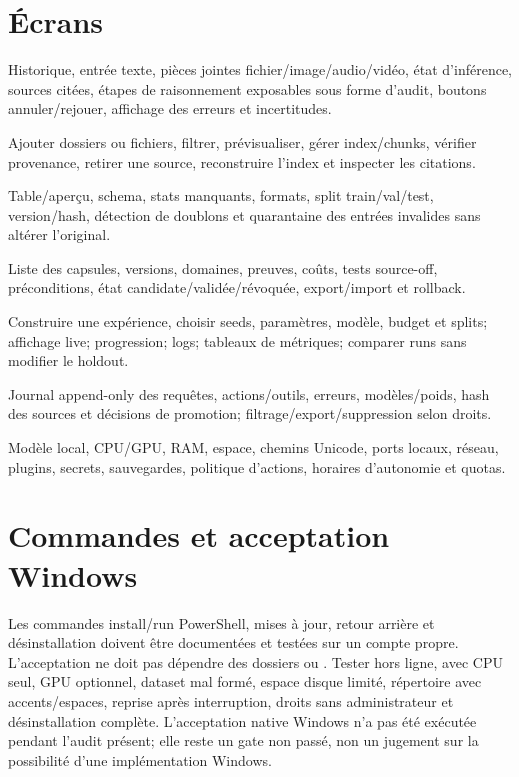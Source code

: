 \documentclass[11pt,a4paper]{report}
\begin{document}
\section{Écrans}
\begin{description}[leftmargin=1.5em,style=nextline]
\item[Chat] Historique, entrée texte, pièces jointes fichier/image/audio/vidéo, état d'inférence, sources citées, étapes de raisonnement exposables sous forme d'audit, boutons annuler/rejouer, affichage des erreurs et incertitudes.
\item[Sources / RAG] Ajouter dossiers ou fichiers, filtrer, prévisualiser, gérer index/chunks, vérifier provenance, retirer une source, reconstruire l'index et inspecter les citations.
\item[Datasets] Table/aperçu, schema, stats manquants, formats, split train/val/test, version/hash, détection de doublons et quarantaine des entrées invalides sans altérer l'original.
\item[Compétences] Liste des capsules, versions, domaines, preuves, coûts, tests source-off, préconditions, état candidate/validée/révoquée, export/import et rollback.
\item[Laboratoire] Construire une expérience, choisir seeds, paramètres, modèle, budget et splits; affichage live; progression; logs; tableaux de métriques; comparer runs sans modifier le holdout.
\item[Historique et audit] Journal append-only des requêtes, actions/outils, erreurs, modèles/poids, hash des sources et décisions de promotion; filtrage/export/suppression selon droits.
\item[Paramètres et ressources] Modèle local, CPU/GPU, RAM, espace, chemins Unicode, ports locaux, réseau, plugins, secrets, sauvegardes, politique d'actions, horaires d'autonomie et quotas.
\end{description}

\section{Commandes et acceptation Windows}
Les commandes install/run PowerShell, mises à jour, retour arrière et désinstallation doivent être documentées et testées sur un compte propre. L'acceptation ne doit pas dépendre des dossiers  ou . Tester hors ligne, avec CPU seul, GPU optionnel, dataset mal formé, espace disque limité, répertoire avec accents/espaces, reprise après interruption, droits sans administrateur et désinstallation complète. L'acceptation native Windows n'a pas été exécutée pendant l'audit présent; elle reste un gate non passé, non un jugement sur la possibilité d'une implémentation Windows.
\end{document}
